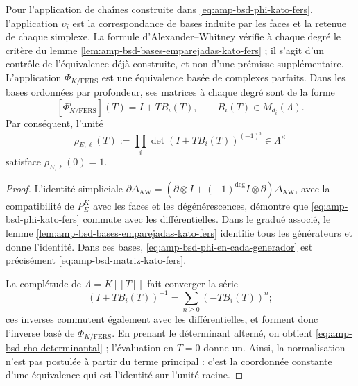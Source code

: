 \begin{lemma}
\label{lem:amp-bsd-equivalencia-kato-fers}
Pour l'application de chaînes construite dans
\eqref{eq:amp-bsd-phi-kato-fers}, l'application \(\upsilon_i\) est la
correspondance de bases induite par les faces et la retenue de chaque
simplexe. La formule d'Alexander--Whitney vérifie à chaque degré le
critère du lemme \ref{lem:amp-bsd-bases-emparejadas-kato-fers} ; il s'agit d'un
contrôle de l'équivalence déjà construite, et non d'une prémisse supplémentaire.
L'application \(\Phi_{K/\mathrm{FERS}}\) est une équivalence basée de
complexes parfaits. Dans les bases ordonnées par profondeur, ses matrices à
chaque degré sont de la forme
\begin{equation}\label{eq:amp-bsd-matriz-kato-fers}
 [\Phi_{K/\mathrm{FERS}}^i](T)=I+TB_i(T),
 \qquad B_i(T)\in M_{d_i}(\Lambda).
\end{equation}
Par conséquent, l'unité
\begin{equation}\label{eq:amp-bsd-rho-determinantal}
 \rho_{E,\ell}(T)
 :=\prod_i\det\!\left(I+TB_i(T)\right)^{(-1)^i}
 \in\Lambda^\times
\end{equation}
satisface \(\rho_{E,\ell}(0)=1\).
\end{lemma}

\begin{proof}
L'identité simpliciale
\(\partial\Delta_{\mathrm{AW}}
=(\partial\otimes I+(-1)^{\deg}I\otimes\partial)
\Delta_{\mathrm{AW}}\), avec la compatibilité de
\(P_E^K\) avec les faces et les dégénérescences, démontre que
\eqref{eq:amp-bsd-phi-kato-fers} commute avec les différentielles. Dans le gradué
associé, le lemme
\ref{lem:amp-bsd-bases-emparejadas-kato-fers} identifie tous les
générateurs et donne l'identité. Dans ces bases,
\eqref{eq:amp-bsd-phi-en-cada-generador} est précisément
\eqref{eq:amp-bsd-matriz-kato-fers}.

La complétude de \(\Lambda=K[[T]]\) fait converger la série
\begin{equation}\label{eq:amp-bsd-inversa-kato-fers}
 (I+TB_i(T))^{-1}
 =\sum_{n\geq0}(-TB_i(T))^n;
\end{equation}
ces inverses commutent également avec les différentielles, et forment donc
l'inverse basé de \(\Phi_{K/\mathrm{FERS}}\). En prenant le déterminant
alterné, on obtient \eqref{eq:amp-bsd-rho-determinantal} ; l'évaluation en
\(T=0\) donne un. Ainsi, la normalisation n'est pas postulée à partir du terme
principal : c'est la coordonnée constante d'une équivalence qui est l'identité
sur l'unité racine.
\end{proof}

